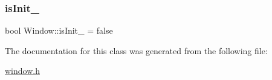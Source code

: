 \subsubsection{\texorpdfstring{is\+Init\+\_\+}{isInit\_}}
{\footnotesize\ttfamily bool Window\+::is\+Init\+\_\+ = false\hspace{0.3cm}{\ttfamily [protected]}}



The documentation for this class was generated from the following file\+:\begin{DoxyCompactItemize}
\item 
\mbox{\hyperlink{window_8h}{window.\+h}}\end{DoxyCompactItemize}
